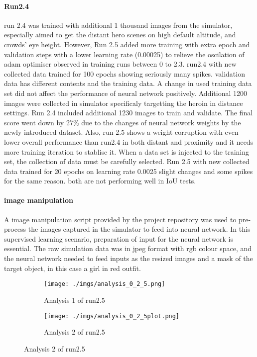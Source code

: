 \documentclass[paper=a4, fontsize=11pt]{scrartcl} %
\numberwithin{equation}{section} %
\numberwithin{figure}{section} %
\numberwithin{table}{section} %
\begin{document}
\begin{enumerate}
\begin{itemize}
{ \paragraph{Run2.4}
 run 2.4 was trained with additional 1 thousand images from the simulator, especially aimed to get the distant hero scenes on high default altitude, and crowds' eye height. However, Run 2.5 added more training with extra epoch and validation steps with a lower learning rate (0.00025) to relieve the oscilation of adam optimiser observed in training runs between 0 to 2.3. run2.4 with new collected data trained for 100 epochs showing seriously many spikes. validation data has different contents and the training data. 
 A change in used training data set did not affect the performance of neural network positively. Additional 1200 images were collected in simulator specificaly targetting the heroin in distance settings. Run 2.4 included additional 1230 images to train and validate. The final score went down by 27\% due to the changes of neural network weights by the newly introduced dataset. Also, run 2.5 shows a weight corruption with even lower overall performance than run2.4 in both distant and proximity and it needs more training iteration to stablise it. When a data set is injected to the training set, the collection of data must be carefully selected.
 Run 2.5 with new collected data trained for 20 epochs on learning rate 0.0025 slight changes and some spikes for the same reason. 
 both are not performing well in IoU tests.

 \paragraph{image manipulation}\label{rubric40}
A image manipulation script provided by the project repository was used to pre-process the images captured in the simulator to feed into neural network. In this supervised learning scenario, preparation of input for the neural network is essential. The raw simulation data was in jpeg format with rgb colour space, and the neural network needed to feed inputs as the resized images and a mask of the target object, in this case a girl in red outfit.
\begin{figure}	
	\begin{subfigure}{0.45\textwidth}
	\texttt{[image: ./imgs/analysis\_0\_2\_5.png]} 
	\caption{Analysis 1 of run2.5}
	\label{fig:subAnalysisRun25}
	\end{subfigure}
	\begin{subfigure}{0.45\textwidth}
	\texttt{[image: ./imgs/analysis\_0\_2\_5plot.png]}
	\caption{Analysis 2 of run2.5}
	\label{fig:subAnalysisRun25plot}
	\end{subfigure}
	 

\end{figure}}
\end{itemize}
\end{enumerate}
\end{document}
